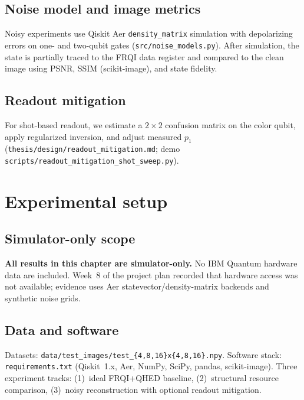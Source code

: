 \subsection{Noise model and image metrics}
Noisy experiments use Qiskit Aer \texttt{density\_matrix} simulation with depolarizing errors on one- and two-qubit gates (\texttt{src/noise\_models.py}). After simulation, the state is partially traced to the FRQI data register and compared to the clean image using PSNR, SSIM (scikit-image), and state fidelity.

\subsection{Readout mitigation}
For shot-based readout, we estimate a $2\times 2$ confusion matrix on the color qubit, apply regularized inversion, and adjust measured $p_1$ (\texttt{thesis/design/readout\_mitigation.md}; demo \texttt{scripts/readout\_mitigation\_shot\_sweep.py}).

\section{Experimental setup}

\subsection{Simulator-only scope}
\textbf{All results in this chapter are simulator-only.} No IBM Quantum hardware data are included. Week~8 of the project plan recorded that hardware access was not available; evidence uses Aer statevector/density-matrix backends and synthetic noise grids.

\subsection{Data and software}
Datasets: \texttt{data/test\_images/test\_\{4,8,16\}x\{4,8,16\}.npy}. Software stack: \texttt{requirements.txt} (Qiskit~1.x, Aer, NumPy, SciPy, pandas, scikit-image). Three experiment tracks: (1)~ideal FRQI+QHED baseline, (2)~structural resource comparison, (3)~noisy reconstruction with optional readout mitigation.

